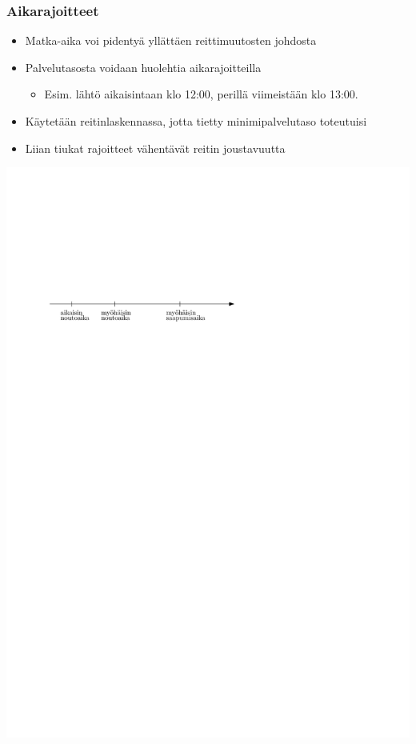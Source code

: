 \documentclass{beamer}
\begin{document}
    
\begin{frame}
\frametitle{Aikarajoitteet}
\begin{itemize}
 \item 
 Matka-aika voi pidentyä yllättäen reittimuutosten johdosta
 \item
 Palvelutasosta voidaan huolehtia aikarajoitteilla
 \begin{itemize}
  \item 
  Esim. lähtö aikaisintaan klo 12:00, perillä viimeistään klo 13:00.
 \end{itemize}
 \item
  Käytetään reitinlaskennassa, jotta tietty minimipalvelutaso toteutuisi
 \item
 Liian tiukat rajoitteet vähentävät reitin joustavuutta
\end{itemize}
\begin{center}
\includegraphics[scale=0.8]{aikaikkuna01}
\end{center}
\end{frame}    
    
\end{document}
